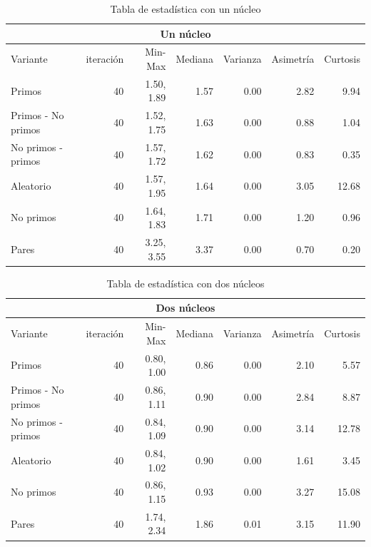 \documentclass{article}
\begin{document}
\begin{table}[H]
\begin{center}
\begin{tabular}{|l | r | r | r | r | r | r|}
\hline
\multicolumn{7}{|c|}{Un núcleo}\\
\hline
Variante&iteración&Min-Max&Mediana&Varianza&Asimetría&Curtosis\\
\hline
 Primos               & 40 & 1.50, 1.89  & 1.57 & 0.00 & 2.82   & 9.94\\
 Primos - No primos   & 40 & 1.52, 1.75  & 1.63 & 0.00 & 0.88   & 1.04\\
 No primos - primos   & 40 & 1.57, 1.72  & 1.62 & 0.00 & 0.83   & 0.35\\
 Aleatorio            & 40 & 1.57, 1.95  & 1.64 & 0.00 & 3.05   & 12.68\\
 No primos            & 40 & 1.64, 1.83  & 1.71 & 0.00 & 1.20   & 0.96\\
 Pares                & 40 & 3.25, 3.55  & 3.37 & 0.00 & 0.70   & 0.20\\
\hline
\end{tabular}
\caption{Tabla de estadística con un núcleo}
\label{table:1}
\end{center}
\end{table}

\begin{table}[H]
\begin{center}
\begin{tabular}{|l | r | r | r | r | r | r|}
\hline
\multicolumn{7}{|c|}{Dos núcleos}\\
\hline
Variante&iteración&Min-Max&Mediana&Varianza&Asimetría&Curtosis\\
\hline
 Primos               & 40 & 0.80, 1.00  & 0.86 & 0.00 & 2.10   & 5.57\\
 Primos - No primos   & 40 & 0.86, 1.11  & 0.90 & 0.00 & 2.84   & 8.87\\
 No primos - primos   & 40 & 0.84, 1.09  & 0.90 & 0.00 & 3.14   & 12.78\\
 Aleatorio            & 40 & 0.84, 1.02  & 0.90 & 0.00 & 1.61   & 3.45\\
 No primos            & 40 & 0.86, 1.15  & 0.93 & 0.00 & 3.27   & 15.08\\
 Pares                & 40 & 1.74, 2.34  & 1.86 & 0.01 & 3.15   & 11.90\\
\hline
\end{tabular}
\caption{Tabla de estadística con dos núcleos}
\label{table:1}
\end{center}
\end{table}
\end{document}
